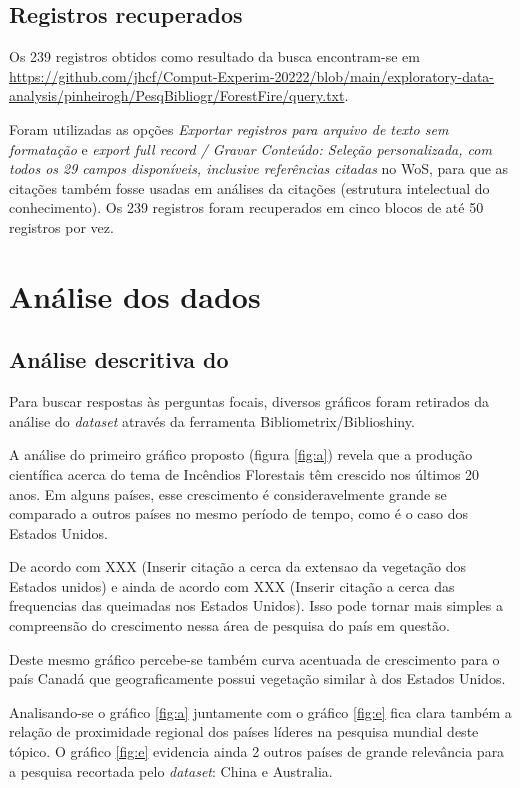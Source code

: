 \subsection{Registros recuperados}

Os 239 registros obtidos como resultado da busca encontram-se em \url{https://github.com/jhcf/Comput-Experim-20222/blob/main/exploratory-data-analysis/pinheirogh/PesqBibliogr/ForestFire/query.txt}.

Foram utilizadas as opções \textit{Exportar registros para arquivo de texto sem formatação} e \textit{export full record / Gravar Conteúdo: Seleção personalizada, com todos os 29 campos disponíveis, inclusive referências citadas} no WoS, para que as citações também fosse usadas em análises da citações (estrutura intelectual do conhecimento). Os 239 registros foram recuperados em cinco blocos de até 50 registros por vez.


\section{Análise dos dados\label{MASSA@jhcf:analise}}


\subsection{Análise descritiva do \dataset}
Para buscar respostas às perguntas focais, diversos gráficos foram retirados da análise do \textit{dataset} através da ferramenta Bibliometrix/Biblioshiny.


A análise do primeiro gráfico proposto (figura \ref{fig:a}) revela que a produção científica acerca do tema de Incêndios Florestais têm crescido nos últimos 20 anos. Em alguns países, esse crescimento é consideravelmente grande se comparado a outros países no mesmo período de tempo, como é o caso dos Estados Unidos.

De acordo com XXX (Inserir citação a cerca da extensao da vegetação dos Estados unidos) e ainda de acordo com XXX (Inserir citação a cerca das frequencias das queimadas nos Estados Unidos). Isso pode tornar mais simples a compreensão do crescimento nessa área de pesquisa do país em questão.

Deste mesmo gráfico percebe-se também curva acentuada de crescimento para o país Canadá que geograficamente possui vegetação similar à dos Estados Unidos.

Analisando-se o gráfico \ref{fig:a} juntamente com o gráfico \ref{fig:e} fica clara também a relação de proximidade regional dos países líderes na pesquisa mundial deste tópico. O gráfico \ref{fig:e} evidencia ainda 2 outros países de grande relevância para a pesquisa recortada pelo \textit{dataset}: China e Australia.

